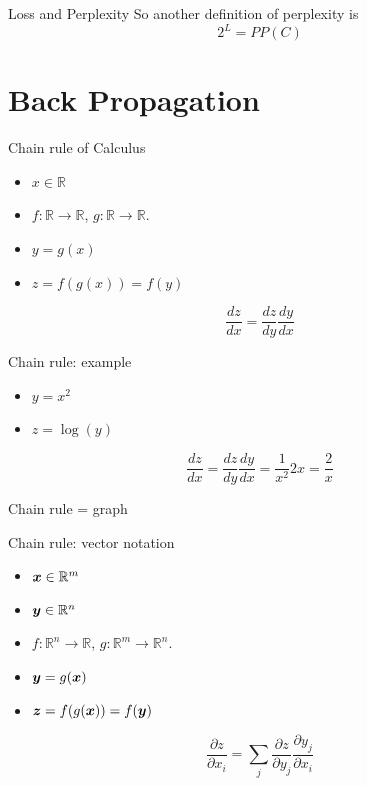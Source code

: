 \documentclass[10pt]{beamer}
\begin{document}
\begin{frame}{Loss and Perplexity}
So another definition of perplexity is
\vspace{0.5cm}
\Large{
\begin{equation*}
2^{L} = PP(C)
\end{equation*}
}
\end{frame}

\section{Back Propagation}

\begin{frame}{Chain rule of Calculus}
\Large{
\begin{itemize}
\item $x \in \mathbb{R}$
\item $f:\mathbb{R} \rightarrow\mathbb{R}$, $g:\mathbb{R} \rightarrow\mathbb{R}$. 
\item $y = g(x)$
\item $z = f(g(x)) = f(y)$
\end{itemize}

\[
\frac{dz}{dx} = \frac{dz}{dy} \frac{dy}{dx} 
\]
}
\end{frame}

\begin{frame}{Chain rule: example}
\Large{
\begin{itemize}
\item $y = x^2$

\vspace{0.3cm}

\item $z = \log(y)$
\end{itemize}

\vspace{0.5cm}

\[
\frac{dz}{dx} = \frac{dz}{dy} \frac{dy}{dx} = \frac{1}{x^2}2x = \frac{2}{x}
\]
}
\end{frame}

\begin{frame}{Chain rule = graph}

\end{frame}

\begin{frame}{Chain rule: vector notation}
\Large{
\begin{itemize}
\item $\bm{x} \in \mathbb{R}^{m}$
\item $\bm{y} \in \mathbb{R}^{n}$
\item $f:\mathbb{R}^{n} \rightarrow\mathbb{R}$, $g:\mathbb{R}^{m} \rightarrow\mathbb{R}^{n}$. 
\item $\bm{y} = g(\bm{x})$
\item $\bm{z} = f(g(\bm{x})) = f(\bm{y})$
\end{itemize}
\[
\frac{\partial z}{\partial x_{i}} =\sum_{j} \frac{\partial z}{\partial y_{j}} \frac{\partial y_{j}}{\partial x_{i}} 
\]
}
\end{frame}
\end{document}
